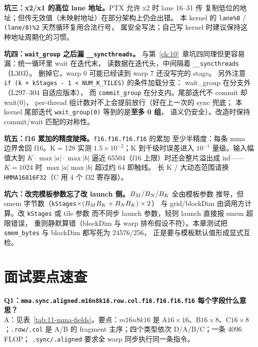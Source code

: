 \textbf{坑三：x2/x1 的高位 lane 地址。}\allowbreak{}PTX 允许 x2 时 lane 16--31 传
复制低位的地址；但传无效值（未映射地址）在部分架构上仍会出错。
本 kernel 的 \texttt{lane\%8} / \texttt{(lane/8)\%2} 天然循环复用合法行号，
属安全写法；自己写 kernel 时建议保持这种地址周期化的习惯。

\textbf{坑四：\texttt{wait\_group} 之后漏 \texttt{\_\allowbreak{}\_\allowbreak{}syncthreads}。}
与第~\ref{ch:10}~章坑四同理但更容易漏：统一循环里 wait 在迭代末，
读数据在迭代头，中间隔着 \texttt{\_\allowbreak{}\_\allowbreak{}syncthreads}（L303）。
删掉它，warp 0 可能已经读到 warp 7 还没写完的 stage。
另外注意 \texttt{if \allowbreak{}(k + k\allowbreak{}Stages - 1 \allowbreak{}< NUM\_\allowbreak{}K\_\allowbreak{}TILES)} 的条件加载分支：
wait\_group 在分支外（L297--304 自适应版本），
而 \texttt{commit\_\allowbreak{}group} 在分支内。尾部迭代不 commit 却 wait(0)，
per-thread 组计数对不上会提前放行（好在上一次的 sync 兜底；
本 kernel 尾部迭代 \texttt{wait\_\allowbreak{}group\allowbreak{}(0)} 等到的是\textbf{至多 0 组}，
语义仍安全）。改造时保持 commit/wait 匹配的对称性。

\textbf{坑五：f16 累加的精度陡降。}\texttt{f16.f16.f16.f16} 的累加
至少半精度：每条 mma 边界舍回 f16。K$=$128 实测
$1.5\times10^{-2}$；K 到千级时误差进入 $10^{-1}$ 量级。输入幅值大到
$K\cdot\max|a|\cdot\max|b|$ 逼近 65504（f16 上限）时还会整片溢出成 inf——
$K{=}1024$ 时 $\max|a|\max|b|$ 超过约 64 即触线。
长 K / 大动态范围请换 \texttt{HMMA16816\allowbreak{}F32}（C 用 4 个 f32 寄存器）。

\textbf{坑六：改完模板参数忘了改 launch 侧。}$B\sb M/B\sb N/B\sb K$ 全由模板参数
推导，但 smem 字节数（\texttt{kStages}$\times(B\sb M B\sb K + B\sb N B\sb K)\times2$）
与 grid/blockDim 由调用方计算。改 \texttt{kStages} 或 tile 参数
而不同步 launch 参数，轻则 launch 直接报 smem 超限错误，
重则静默算错（blockDim 与 warp 排布假设不符）。本章测试把
\texttt{smem\_bytes} 与 blockDim 都写死为 24576/256，
正是要与模板默认值形成显式互检。

\section{面试要点速查}

\textbf{Q1：\texttt{mma.\allowbreak{}sync.\allowbreak{}aligned.\allowbreak{}m16n8k16.row.\allowbreak{}col.\allowbreak{}f16.f16.f16.f16}
每个字段什么意思？}\\
A：见表~\ref{tab:11-mma-fields}。要点：$m16n8k16$ 是
A$16\times16$、B$16\times8$、C$16\times8$；\texttt{.row/.col} 是 A/B 的
fragment 主序；四个类型依次 D/A/B/C；一条 4096 FLOP；
\texttt{.\allowbreak{}sync/\allowbreak{}.\allowbreak{}aligned} 要求全 warp 同步执行同一条指令。

